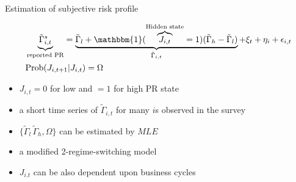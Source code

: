 \documentclass{beamer}
\begin{document}
\begin{frame}{Estimation of subjective 
risk profile}
\label{RegimeEstimation}

\begin{equation*}
	\begin{split}
&	\underbrace{\tilde \Gamma^s_{i,t}}_{\text{reported PR}} = \underbrace{\tilde \Gamma_l + \mathbbm{1}(\overbrace{J_{i,t}}^{\text{Hidden state}}= 1)( \tilde \Gamma_h -\tilde \Gamma_l)}_{\tilde \Gamma_{i,t}} +\xi_{t}+\eta_{i}+ \epsilon_{i,t}\\
& \text{Prob}(J_{i,t+1}|J_{i,t}) = \Omega
\end{split}
\end{equation*}

\begin{itemize}
	
	\item $J_{i,t} =0$ for low and $=1$ for high PR state
	\item a short time series of $\tilde \Gamma_ {i,t}$ for many $i$s observed in the survey 
	\item $\{\tilde \Gamma_l\,\tilde \Gamma_h,\Omega\}$ can be estimated by $MLE$
	\item a modified \cite{hamilton1989new} 2-regime-switching model 
	\item $J_{i.t}$ can be also dependent upon business cycles 
\end{itemize}
\hyperlink{appendix:RegimeEstimationDetail}{} 
\end{frame}
\end{document}
